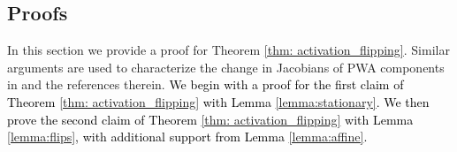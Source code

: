 \subsection{Proofs}
In this section we provide a proof for Theorem \ref{thm: activation_flipping}. 
Similar arguments are used to characterize the change in Jacobians of PWA components in \cite{pwa_comp} and the references therein.
\textcolor{black}{We begin with a proof for the first claim of Theorem \ref{thm: activation_flipping} with Lemma \ref{lemma:stationary}.
We then prove the second claim of Theorem \ref{thm: activation_flipping} with Lemma \ref{lemma:flips}, with additional support from Lemma \ref{lemma:affine}.}



